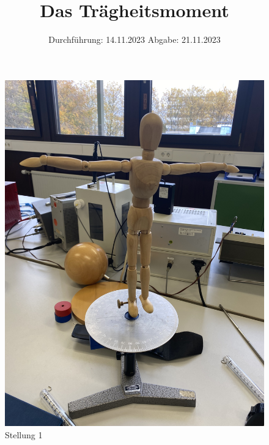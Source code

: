 

\subject{v101}
\title{Das Trägheitsmoment}
\date{%
  Durchführung: 14.11.2023
  \hspace{3em}
  Abgabe: 21.11.2023
}



\maketitle
\thispagestyle{empty}
\tableofcontents
\newpage







\begin{figure}
  \centering
  \includegraphics[width=\textwidth, angle=270]{Bilder/Stellung1.jpg}
  \caption{Stellung 1}
  \label{fig:Stellung1}
\end{figure}
